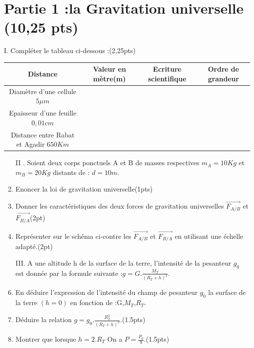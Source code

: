 \documentclass[12pt]{article}
\begin{document}
 \section*{Partie 1 :la Gravitation universelle \dotfill(10,25 pts)}

	 I. Compléter le tableau ci-dessous :\dotfill(2,25pts)
\begin{center}
\begin{tabular}{ | c | c | c | c | }
	\hline
			Distance		& Valeur en mètre(m) & Ecriture scientifique &Ordre de grandeur  \\\hline 
Diamètre d’une cellule $5\mu m$				    & \dotfill        &\dotfill &\dotfill \\\hline  
	Epaisseur d’une feuille $0,01cm$  & \dotfill& \dotfill  & \dotfill\\\hline  
	\makecell{Distance entre \\Rabat et Agadir $650 Km$} & \dotfill & \dotfill &\dotfill \\\hline  
\end{tabular}
\end{center}
 \begin{enumerate}

\item[II]. Soient deux corps ponctuels A et B de masses respectives $m_A = 10Kg$ et $m_B=20Kg$
distants de : $d =10m$.

\item Enoncer la loi de gravitation universelle\dotfill(1pts)
\item Donner les caractéristiques des deux forces de gravitation universelles               $\vec{F_{A/B}}$ et $\vec{F_{B/A}}$\dotfill(2pt)
\item Représenter sur le schéma ci-contre les  $\vec{F_{A/B}}$ et $\vec{F_{B/A}}$ en utilisant une échelle adapté.\dotfill(2pt)
\item[III.] A une altitude h de la surface de la terre, l’intensité de la pesanteur $g_0$ est donnée par la formule suivante :$g = G.\frac{M_T}{(R_T + h)^2}$.

\item En déduire l’expression de l’intensité du champ de pesanteur
$g_0$ la surface de la terre $(h=0)$ en fonction de :G,$M_T$,$R_T$.

\item Déduire la relation $g=g_0.\frac{R_T^2}{(R_T + h)^2}$.\dotfill(1.5pts)
\item Montrer que lorsque $h = 2.R_T$ On a $P=\frac{P_0}{9}$.\dotfill(1.5pts)
 \end{enumerate}
\end{document}
